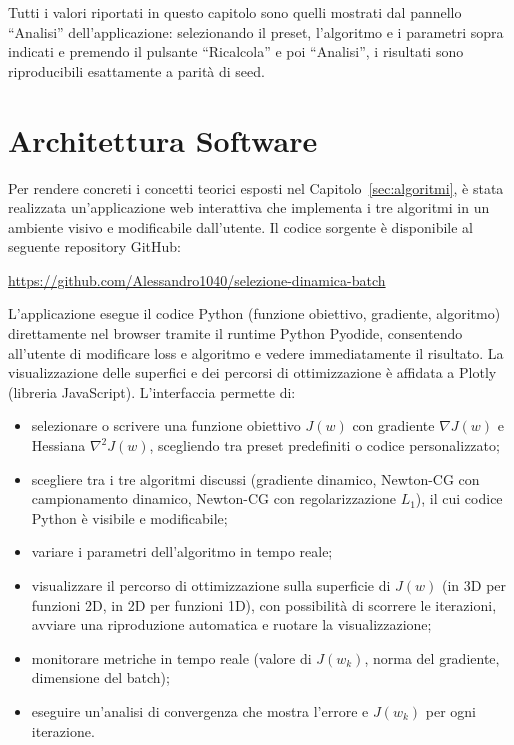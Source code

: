 \documentclass[italian, a4paper, twoside, binding=6mm]{sapthesis}
\begin{document}
Tutti i valori riportati in questo capitolo sono quelli mostrati dal pannello
``Analisi'' dell'applicazione: selezionando il preset, l'algoritmo e i
parametri sopra indicati e premendo il pulsante ``Ricalcola'' e poi
``Analisi'', i risultati sono riproducibili esattamente a parità di seed.

\section{Architettura Software}\label{sec:architettura}

Per rendere concreti i concetti teorici esposti nel
Capitolo~\ref{sec:algoritmi}, è stata realizzata un'applicazione web
interattiva che implementa i tre algoritmi in un ambiente visivo e
modificabile dall'utente. Il codice sorgente è disponibile al seguente
repository GitHub:
\begin{center}
  \url{https://github.com/Alessandro1040/selezione-dinamica-batch}
\end{center}

L'applicazione esegue il codice Python (funzione obiettivo, gradiente,
algoritmo) direttamente nel browser tramite il runtime Python
Pyodide, consentendo all'utente di modificare loss e algoritmo e vedere
immediatamente il risultato. La visualizzazione delle superfici e dei
percorsi di ottimizzazione è affidata a Plotly (libreria JavaScript).
L'interfaccia permette di:

\begin{itemize}
  \item selezionare o scrivere una funzione obiettivo $J(w)$ con gradiente
  $\nabla J(w)$ e Hessiana $\nabla^2 J(w)$, scegliendo tra preset predefiniti
  o codice personalizzato;
  \item scegliere tra i tre algoritmi discussi (gradiente dinamico,
  Newton-CG con campionamento dinamico, Newton-CG con regolarizzazione
  $L_1$), il cui codice Python è visibile e modificabile;
  \item variare i parametri dell'algoritmo in tempo reale;
  \item visualizzare il percorso di ottimizzazione sulla superficie di
  $J(w)$ (in 3D per funzioni 2D, in 2D per funzioni 1D), con possibilità di
  scorrere le iterazioni, avviare una riproduzione automatica e ruotare la
  visualizzazione;
  \item monitorare metriche in tempo reale (valore di $J(w_k)$, norma del
  gradiente, dimensione del batch);
  \item eseguire un'analisi di convergenza che mostra l'errore e $J(w_k)$
  per ogni iterazione.
\end{itemize}
\end{document}
